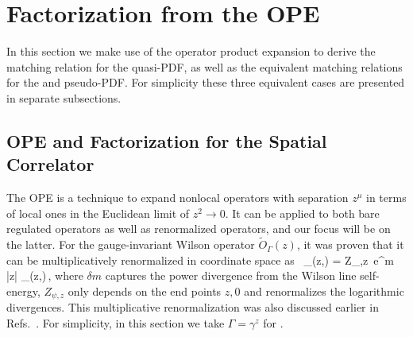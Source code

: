 \section{Factorization from the OPE}
\label{sec:ope}

In this section we make use of the operator product expansion to derive the matching relation for the quasi-PDF, as well as the equivalent matching relations for the \spcorr and pseudo-PDF. For simplicity these three equivalent cases are presented in separate subsections.

\subsection{OPE and Factorization for the Spatial Correlator}

The OPE is a technique to expand nonlocal operators with separation $z^\mu$ in terms of local ones in the Euclidean limit of $z^2\to 0$.
It can be applied to both bare regulated operators as well as renormalized operators, and our focus will be on the latter. For the gauge-invariant Wilson operator $\tilde{O}_\Gamma(z)$, it was proven that it can be multiplicatively renormalized in  coordinate space as~\cite{Ji:2017oey,Ishikawa:2017faj}
\beq \label{eq:ren}
_\Gamma(z,\mu) = Z_{\psi,z}\, e^{\delta m |z|} _\Gamma(z,\epsilon)\,,
\eeq
where $\delta m$ captures the power divergence from the Wilson line self-energy, $Z_{\psi,z}$ only depends on the end points $z,0$ and renormalizes the logarithmic divergences. This multiplicative renormalization was also discussed earlier in Refs.~\cite{Ishikawa:2016znu,Chen:2016fxx,Constantinou:2017sej}.  For simplicity, in this section we take $\Gamma=\gamma^z$ for .

